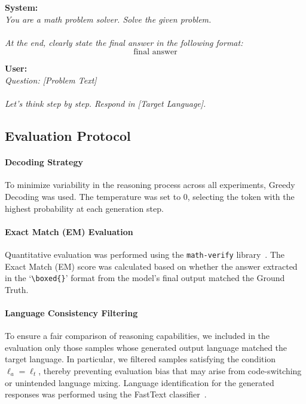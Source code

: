 \begin{tcolorbox}[
width=\columnwidth,
  colback=gray!5,
  colframe=black,
  boxrule=0.6pt,
  arc=6pt,
  left=8pt,
  right=8pt,
  top=6pt,
  bottom=6pt,
  title=Prompt for CoT
]
\small\raggedright
\textbf{System:}\\
\textit{You are a math problem solver. Solve the given problem.\\
\\
At the end, clearly state the final answer in the following format:}
\[
\boxed{\text{final answer}}
\]

\vspace{3pt}
\textbf{User:}\\
\textit{Question: [Problem Text]\\
\\
Let's think step by step. Respond in [Target Language].}
\end{tcolorbox}

\subsection{Evaluation Protocol}\label{Appendix:Evaluation-protocol}

\paragraph{Decoding Strategy}
To minimize variability in the reasoning process across all experiments, Greedy Decoding was used. The temperature was set to 0, selecting the token with the highest probability at each generation step.

\paragraph{Exact Match (EM) Evaluation}
Quantitative evaluation was performed using the \texttt{math-verify} library~\citep{mathverify}. The Exact Match (EM) score was calculated based on whether the answer extracted in the `\verb|\boxed{}|' format from the model's final output matched the Ground Truth.

\paragraph{Language Consistency Filtering}
To ensure a fair comparison of reasoning capabilities, we included in the evaluation only those samples whose generated output language matched the target language. In particular, we filtered samples satisfying the condition $\ell_a = \ell_t$, thereby preventing evaluation bias that may arise from code-switching or unintended language mixing. Language identification for the generated responses was performed using the FastText classifier~\citep{fasttext}.


